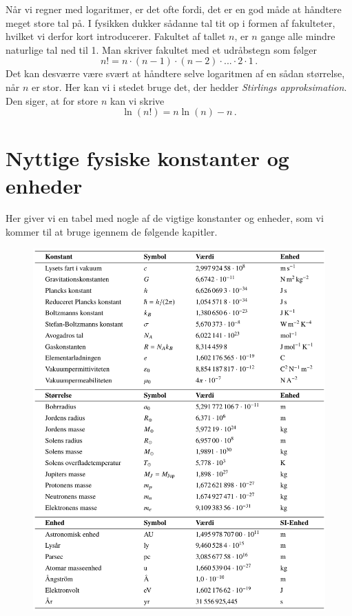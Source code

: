 Når vi regner med logaritmer, er det ofte fordi, det er en god måde at håndtere meget store tal på. I fysikken dukker sådanne tal tit op i formen af fakulteter, hvilket vi derfor kort introducerer. 
Fakultet af tallet $n$, er $n$ gange alle mindre naturlige tal ned til 1.
Man skriver fakultet med et udråbstegn som følger
\begin{equation}
    n!=n\cdot(n-1)\cdot(n-2)\cdot ...\cdot 2\cdot 1 \, .
\end{equation}
Det kan desværre være svært at håndtere selve logaritmen af en sådan størrelse, når $n$ er stor.
Her kan vi i stedet bruge det, der hedder {\em Stirlings approksimation}.
Den siger, at for store $n$ kan vi skrive
\begin{equation}
    \ln(n!)=n\ln(n)-n \, .
\end{equation}

\newpage

\section{Nyttige fysiske konstanter og enheder}

Her giver vi en tabel med nogle af de vigtige konstanter og enheder, som vi kommer til at bruge igennem de følgende kapitler.

\begin{figure} [h!]
    \centering
    \includegraphics[width = 0.92 \textwidth]{Mat/matfig/Konstanter.pdf}
    \label{fysiske_konstanter}
\end{figure}

